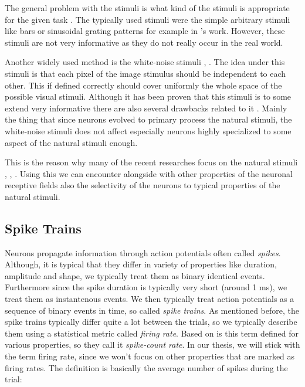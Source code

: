 The general problem with the stimuli is what kind of the stimuli is appropriate 
for the given task \citet{carandini2005we}. The typically used stimuli were the 
simple arbitrary stimuli like bars or sinusoidal grating patterns for example in 
\citet{hubel1965receptive}'s work. However, these
stimuli are not very informative as they do not really occur in the real world.

Another widely used method is the white-noise stimuli \citet{dayan2005theoretical},
\citet{chichilnisky2001simple}. The idea under this stimuli is 
that each pixel of the image stimulus should be independent to each other. This 
if defined correctly should cover uniformly the whole space of the possible visual 
stimuli. Although it has been proven that this stimuli is to some extend very 
informative there are also several drawbacks related to it \citet{Talebi1560}. 
Mainly the thing that since neurons evolved to primary process the natural stimuli, 
the white-noise stimuli does not affect especially neurons highly specialized to 
some aspect of the natural stimuli enough. 

This is the reason why many of the recent 
researches focus on the natural stimuli \citet{sonkusare2019naturalistic}, 
\citet{lurz2020generalization}, \citet{antolik2024comprehensive}. Using this we can 
encounter alongside with other properties of the neuronal receptive fields also the 
selectivity of the neurons to typical properties of the natural stimuli.

\subsection{Spike Trains}
\label{subsec:spike_trains}
Neurons propagate information through action potentials often called \emph{spikes}. 
Although, it is typical that they differ in variety of properties like duration, 
amplitude and shape, we typically 
treat them as binary identical events. Furthermore since the spike duration
is typically very short (around 1 ms), we treat them as instantenous events. We then
typically treat action potentials as a sequence of binary events in time, so called
\emph{spike trains}. As mentioned before, the spike trains typically differ quite 
a lot between the trials, so we typically describe them using a statistical metric 
called \emph{firing rate}. Based on \citet{dayan2005theoretical} is this term defined
for various properties, so they call it \emph{spike-count rate}. In our thesis, we 
will stick with the term firing rate, since we won't focus on other properties 
that are marked as firing rates. The definition is basically the average number of 
spikes during the trial:

